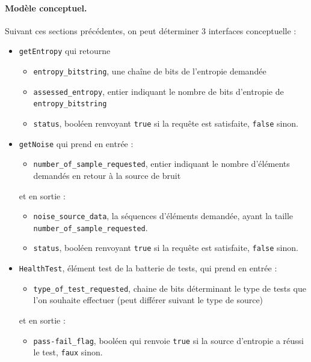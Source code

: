 \paragraph{Modèle conceptuel.\\}
Suivant ces sections précédentes, on peut déterminer 3 interfaces conceptuelle :
\begin{itemize}
\item \texttt{getEntropy} qui retourne 
	\begin{itemize}
	\item \texttt{entropy\_bitstring}, une chaîne de bits de l'entropie demandée
	\item \texttt{assessed\_entropy}, entier indiquant le nombre de bits d'entropie de \texttt{entropy\_bitstring}
	\item \texttt{status}, booléen renvoyant \texttt{true} si la requête est satisfaite, \texttt{false} sinon.\\
	\end{itemize}
\item \texttt{getNoise}	 qui prend en entrée : 
	\begin{itemize}
	\item \texttt{number\_of\_sample\_requested}, entier indiquant le nombre d'éléments demandés en retour à la source de bruit
	\end{itemize}
et en sortie : 
	\begin{itemize}
	\item \texttt{noise\_source\_data}, la séquences d'éléments demandée, ayant la taille \texttt{number\_of\_sample\_requested}.
	\item \texttt{status}, booléen renvoyant \texttt{true} si la requête est satisfaite, \texttt{false} sinon.\\
	\end{itemize}
\item \texttt{HealthTest}, élément test de la batterie de tests, qui prend en entrée :
	\begin{itemize}
	\item \texttt{type\_of\_test\_requested}, chaine de bits déterminant le type de tests que l'on souhaite effectuer (peut différer suivant le type de source)
	\end{itemize}
et en sortie : 
	\begin{itemize}
	\item \texttt{pass-fail\_flag}, booléen qui renvoie \texttt{true} si la source d'entropie a réussi le test, \texttt{faux} sinon.
	\end{itemize}	
\end{itemize}


